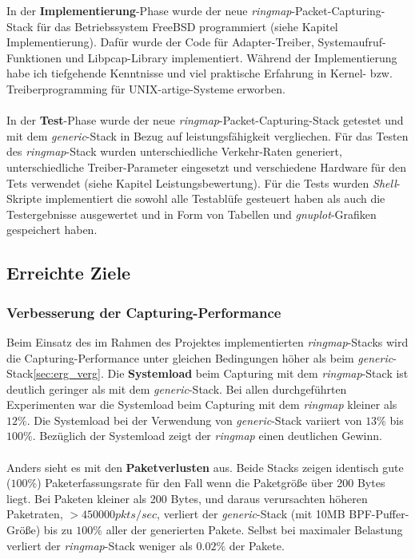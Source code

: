 {%
In der \textbf{Implementierung}-Phase wurde der neue
\emph{ringmap}-Packet-Capturing-Stack für das Betriebssystem FreeBSD
programmiert (siehe Kapitel Implementierung). Dafür wurde der Code für
Adapter-Treiber, Systemaufruf-Funktionen und Libpcap-Library implementiert.
Während der Implementierung  habe ich tiefgehende Kenntnisse und viel
praktische Erfahrung in  Kernel- bzw. Treiberprogramming für
UNIX-artige-Systeme erworben.  \\\\
%
In der \textbf{Test}-Phase wurde der neue \emph{ringmap}-Packet-Capturing-Stack
getestet und mit dem \emph{generic}-Stack in Bezug auf leistungsfähigkeit
vergliechen. Für das Testen des \emph{ringmap}-Stack wurden unterschiedliche
Verkehr-Raten generiert, unterschiedliche Treiber-Parameter eingesetzt und
verschiedene Hardware für den Tets verwendet (siehe Kapitel
Leistungsbewertung). Für die Tests wurden \emph{Shell}-Skripte implementiert
die sowohl alle Testablüfe gesteuert haben als auch die Testergebnisse
ausgewertet und in Form von Tabellen und \emph{gnuplot}-Grafiken gespeichert
haben. 
}
\subsection{Erreichte Ziele}

\subsubsection{Verbesserung der Capturing-Performance}
Beim Einsatz des im Rahmen des Projektes implementierten \emph{ringmap}-Stacks
wird die Capturing-Performance unter gleichen Bedingungen höher als beim
\emph{generic}-Stack\ref{sec:erg_verg}. Die \textbf{Systemload} beim Capturing
mit dem \emph{ringmap}-Stack ist deutlich geringer als mit dem
\emph{generic}-Stack.  Bei allen durchgeführten Experimenten war die Systemload
beim Capturing mit dem \emph{ringmap} kleiner als $12\%$. Die Systemload bei
der Verwendung von \emph{generic}-Stack variiert von $13\%$ bis $100\%$.
Bezüglich der Systemload zeigt der \emph{ringmap} einen deutlichen Gewinn.\\\\
%
Anders sieht es mit den \textbf{Paketverlusten} aus. Beide Stacks zeigen
identisch gute ($100\%$) Paketerfassungsrate für den Fall wenn die Paketgröße
über 200 Bytes liegt. Bei Paketen kleiner als 200 Bytes, und daraus
verursachten höheren Paketraten, $> 450000 pkts/sec$, verliert der
\emph{generic}-Stack (mit 10MB BPF-Puffer-Größe) bis zu $100\%$ aller der
generierten Pakete. Selbst bei maximaler Belastung verliert der \emph{ringmap}-Stack 
weniger als $0.02\%$ der Pakete.
%
